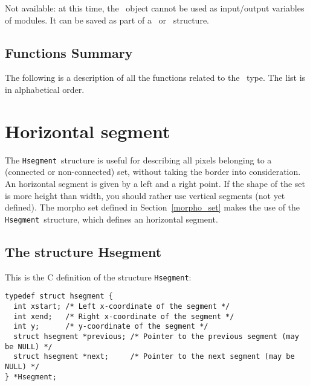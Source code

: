 Not available: at this time, the \pt\ object cannot be used as input/output variables of modules.
It can be saved as part of a \mline\ or \fmline\ structure.

\subsection{Functions Summary}
\label{point_type-function}

The following is a description of all the functions related to 
the \pt\ type. The list is in alphabetical order.

\newpage %



\section{Horizontal segment}


\label{hsegment}

\def\hsegment{{\tt Hsegment}}
\def\mset{{\tt Morpho\_set}}


The \hsegment\ structure is useful for describing all pixels belonging to a (connected or non-connected)
set, without taking the border into consideration.
An horizontal segment is given by a left and a right point. 
If the shape of the set is more height than width, you should rather use vertical segments
(not yet defined).
The morpho set defined in Section~\ref{morpho_set} makes the use
of the \hsegment\ structure, which defines an horizontal segment.

\subsection{The structure Hsegment}
\label{hsegment-structure}

This is the C definition of the structure \hsegment:
\index{structure!\hsegment@\hsegment} 
{\small
\begin{verbatim}
typedef struct hsegment {
  int xstart; /* Left x-coordinate of the segment */
  int xend;   /* Right x-coordinate of the segment */
  int y;      /* y-coordinate of the segment */
  struct hsegment *previous; /* Pointer to the previous segment (may be NULL) */
  struct hsegment *next;     /* Pointer to the next segment (may be NULL) */
} *Hsegment;

\end{verbatim}
}

